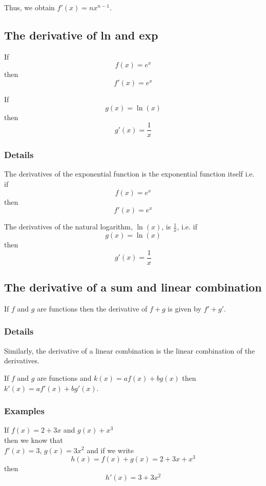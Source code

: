 \documentclass[12pt,a4paper]{article}
\theoremstyle{regla}
\theoremstyle{remark}
\theoremstyle{definition}
\theoremstyle{nonumberbreak}
\begin{document}
Thus, we obtain $f'(x)=nx^{n-1}$.


\subsection{The derivative of ln and exp}
\begin{fbox}
\begin{minipage}{0.97\textwidth}
If
	$$f(x)  = e^x$$
then
	$$f'(x) = e^x$$

If	
	$$g(x) = \ln(x)$$
then
	$$g'(x) = \frac{1}{x}$$

\end{minipage}
\end{fbox}
\subsubsection{Details}
The derivatives of the  exponential function is the exponential  function itself i.e. \\ if
	$$f(x)  = e^x$$
then
	$$f'(x) = e^x$$


The derivatives of the natural logarithm, $\ln(x)$, is $\frac{1}{x}$, i.e.
if	
	$$g(x) = \ln(x)$$
then
	$$g'(x) = \frac{1}{x}$$


\subsection{The derivative of a sum and linear combination}
\begin{fbox}
\begin{minipage}{0.97\textwidth}
If $f$ and $g$ are functions then the derivative of $f+g$ is given by $f' + g'$. 
\end{minipage}
\end{fbox}
\subsubsection{Details}
Similarly, the derivative of a linear combination is the linear combination of the derivatives.

If $f$ and $g$ are functions and $k(x)=af(x) + bg(x)$ then $k'(x)=af'(x)+ bg'(x)$.
\subsubsection{Examples}
\begin{xmpl}
If $f(x) = 2+3x$ and $g(x)+x^3$ \\
then we know that\\ 
$f'(x)=3$, $g(x)=3x^2$
 and if we write 
$$h(x)=f(x)+g(x)=2+3x+x^3$$
 then 
$$h'(x)=3+3x^2$$
\end{xmpl}
\end{document}
